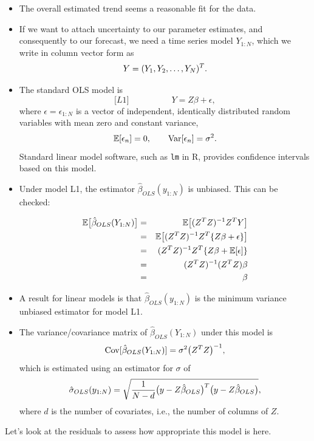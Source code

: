 \documentclass[]{article}
\begin{document}
\begin{itemize}
\item
  The overall estimated trend seems a reasonable fit for the data.
\item
  If we want to attach uncertainty to our parameter estimates, and
  consequently to our forecast, we need a time series model \(Y_{1:N}\),
  which we write in column vector form as
  \[Y = (Y_1,Y_2,\dots,Y_N)^{\scriptsize{T}}.\]
\item
  The standard OLS model is $${[}L1{]}
  \quad\quad\quad\quad\quad Y = Z\beta + \epsilon,$$ where
  \(\epsilon=\epsilon_{1:N}\) is a vector of independent, identically
  distributed random variables with mean zero and constant variance,
  \[\mathbb{E}[\epsilon_n]=0, \quad\quad \mathrm{Var}[\epsilon_n] = \sigma^2.\] Standard
  linear model software, such as \texttt{lm} in R, provides confidence
  intervals based on this model.
\item
  Under model L1, the estimator \(\hat\beta_{OLS}(y_{1:N})\) is
  unbiased. This can be checked:

  \begin{eqnarray}
  \mathbb{E}\big[\hat\beta_{OLS}(Y_{1:N})\big] &=&\mathbb{E}\big[ (Z^{\scriptsize{T}} Z)^{-1}Z^{\scriptsize{T}} Y \big]\\
  &=& \mathbb{E}\big[ (Z^{\scriptsize{T}} Z)^{-1}Z^{\scriptsize{T}} \{Z\beta + \epsilon \}\big]\\
  &=&  (Z^{\scriptsize{T}} Z)^{-1}Z^{\scriptsize{T}} \{Z\beta + \mathbb{E}[\epsilon]\} \\
  &=&  (Z^{\scriptsize{T}} Z)^{-1}(Z^{\scriptsize{T}} Z)\beta \\
  &=& \beta
  \end{eqnarray}
\item
  A result for linear models is that \(\hat\beta_{OLS}(y_{1:N})\) is the
  minimum variance unbiased estimator for model L1.
\item
  The variance/covariance matrix of \(\hat\beta_{OLS}(Y_{1:N})\) under
  this model is
  \[\mathrm{Cov}[\hat\beta_{OLS}(Y_{1:N})] = \sigma^2 \big( Z^{\scriptsize{T}} Z\big)^{-1},\]
  which is estimated using an estimator for \(\sigma\) of
  \[\hat\sigma_{OLS}(y_{1:N})= \sqrt{\frac{1}{N-d} \big(y-Z\hat\beta_{OLS}\big)^{\scriptsize{T}} \big(y-Z\hat\beta_{OLS}\big)},\]
  where \(d\) is the number of covariates, i.e., the number of columns
  of \(Z\).
\end{itemize}

Let's look at the residuals to assess how appropriate this model is
here.
\end{document}
